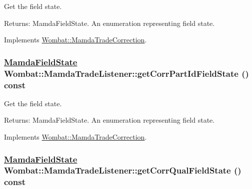 Get the field state. 

\begin{Desc}
\item[Returns:]Mamda\-Field\-State. An enumeration representing field state. \end{Desc}


Implements \hyperlink{classWombat_1_1MamdaTradeCorrection_bf9f519809865d458b8f8daeb0391eb9}{Wombat::Mamda\-Trade\-Correction}.\hypertarget{classWombat_1_1MamdaTradeListener_f6fa0ee1c2489746e1ee0bd5a6560d07}{
\subsubsection[getCorrPartIdFieldState]{\setlength{\rightskip}{0pt plus 5cm}\hyperlink{namespaceWombat_93aac974f2ab713554fd12a1fa3b7d2a}{Mamda\-Field\-State} Wombat::Mamda\-Trade\-Listener::get\-Corr\-Part\-Id\-Field\-State () const}}
\label{classWombat_1_1MamdaTradeListener_f6fa0ee1c2489746e1ee0bd5a6560d07}


Get the field state. 

\begin{Desc}
\item[Returns:]Mamda\-Field\-State. An enumeration representing field state. \end{Desc}


Implements \hyperlink{classWombat_1_1MamdaTradeCorrection_8df9e9f374ef26377add4eec1da4bd43}{Wombat::Mamda\-Trade\-Correction}.\hypertarget{classWombat_1_1MamdaTradeListener_daad2759f93458592e1c984b983443bd}{
\subsubsection[getCorrQualFieldState]{\setlength{\rightskip}{0pt plus 5cm}\hyperlink{namespaceWombat_93aac974f2ab713554fd12a1fa3b7d2a}{Mamda\-Field\-State} Wombat::Mamda\-Trade\-Listener::get\-Corr\-Qual\-Field\-State () const}}
\label{classWombat_1_1MamdaTradeListener_daad2759f93458592e1c984b983443bd}


